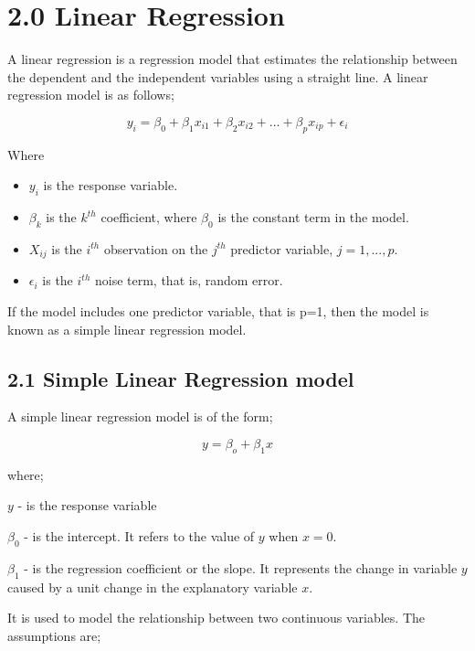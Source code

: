 \documentclass[
]{article}
\begin{document}
\newpage

\hypertarget{linear-regression}{%
\section{2.0 Linear Regression}\label{linear-regression}}

A linear regression is a regression model that estimates the
relationship between the dependent and the independent variables using a
straight line. A linear regression model is as follows;

\[y_i=\beta_0+\beta_1x_{i1}+\beta_2x_{i2}+{...}+\beta_px_{ip}+\epsilon_i\]

Where

\begin{itemize}
\item
  \(y_i\) is the response variable.
\item
  \(\beta_k\) is the \(k^{th}\) coefficient, where \(\beta_0\) is the
  constant term in the model.
\item
  \(X_{ij}\) is the \(i^{th}\) observation on the \(j^{th}\) predictor
  variable, \(j = 1, ..., p.\)
\item
  \(\epsilon_i\) is the \(i^{th}\) noise term, that is, random error.
\end{itemize}

If the model includes one predictor variable, that is p=1, then the
model is known as a simple linear regression model.

\hypertarget{simple-linear-regression-model}{%
\subsection{2.1 Simple Linear Regression
model}\label{simple-linear-regression-model}}

A simple linear regression model is of the form;

\[y=\beta_o+\beta_1x\]

where;

\(y\) - is the response variable

\(\beta_0\) - is the intercept. It refers to the value of \(y\) when
\(x=0\).

\(\beta_1\) - is the regression coefficient or the slope. It represents
the change in variable \(y\) caused by a unit change in the explanatory
variable \(x\).

It is used to model the relationship between two continuous variables.
The assumptions are;
\end{document}
